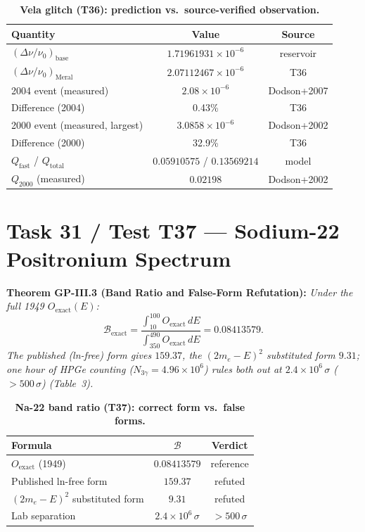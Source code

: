\documentclass[12pt,a4paper]{article}
\begin{document}
\begin{table}[!htbp]
\centering\footnotesize
\setlength{\tabcolsep}{3pt}
\caption{\textbf{Vela glitch (T36): prediction vs.\ source-verified observation.}}
\label{tab:vela}
\vspace{0.1cm}
\begin{tabular}{@{}l|c|c@{}}
\toprule
Quantity & Value & Source \\
\midrule
$(\Delta\nu/\nu_0)_{\mathrm{base}}$ & $1.71961931\times 10^{-6}$ & reservoir \\
$(\Delta\nu/\nu_0)_{\mathrm{Meral}}$ & $2.07112467\times 10^{-6}$ & T36 \\
2004 event (measured) & $2.08\times 10^{-6}$ & Dodson+2007 \\
Difference (2004) & 0.43\% & T36 \\
2000 event (measured, largest) & $3.0858\times 10^{-6}$ & Dodson+2002 \\
Difference (2000) & 32.9\% & T36 \\
$Q_{\mathrm{fast}}$ / $Q_{\mathrm{total}}$ & $0.05910575$ / $0.13569214$ & model \\
$Q_{2000}$ (measured) & $0.02198$ & Dodson+2002 \\
\bottomrule
\end{tabular}
\end{table}

\section{Task 31 / Test T37 --- Sodium-22 Positronium Spectrum}

\textbf{Theorem GP-III.3 (Band Ratio and False-Form Refutation):}
\textit{Under the full 1949 $O_{\mathrm{exact}}(E)$:}
\begin{equation}
\boxed{\mathcal{B}_{\mathrm{exact}}
=\frac{\int_{10}^{100}O_{\mathrm{exact}}\,dE}
{\int_{350}^{490}O_{\mathrm{exact}}\,dE}=0.08413579.}
\end{equation}
\textit{The published (ln-free) form gives $159.37$, the $(2m_e-E)^2$
substituted form $9.31$; one hour of HPGe counting ($N_{3\gamma}=4.96\times
10^6$) rules both out at $2.4\times 10^6\,\sigma$ ($>500\,\sigma$) (Table~3).}

\begin{table}[!htbp]
\centering\footnotesize
\setlength{\tabcolsep}{3pt}
\caption{\textbf{Na-22 band ratio (T37): correct form vs.\ false forms.}}
\label{tab:na22}
\vspace{0.1cm}
\begin{tabular}{@{}l|c|c@{}}
\toprule
Formula & $\mathcal{B}$ & Verdict \\
\midrule
$O_{\mathrm{exact}}$ (1949) & $0.08413579$ & reference \\
Published ln-free form & $159.37$ & refuted \\
$(2m_e-E)^2$ substituted form & $9.31$ & refuted \\
Lab separation & $2.4\times 10^6\,\sigma$ & $>500\,\sigma$ \\
\bottomrule
\end{tabular}
\end{table}
\end{document}
